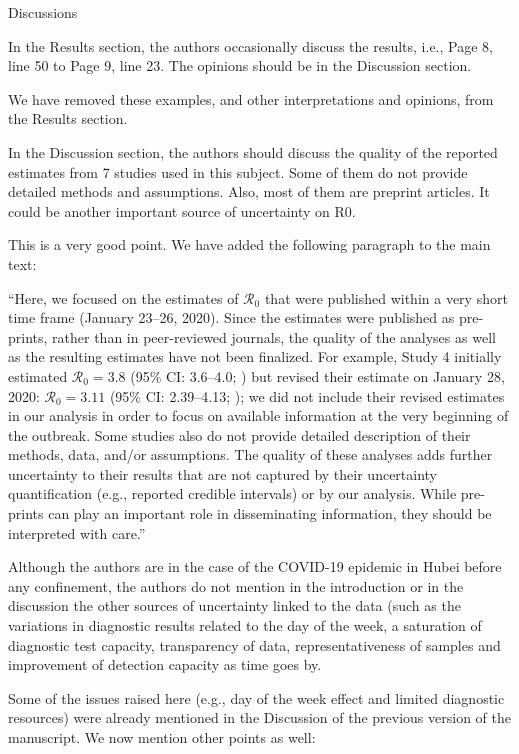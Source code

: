 \documentclass[12pt]{article}
\newcommand{\Ro}{\ensuremath{{\mathcal R}_{0}}\xspace}
\newcommand{\revtext}{\textsf}
\begin{document}
\revtext{Discussions}

\revtext{In the Results section, the authors occasionally discuss the results, i.e., Page 8, line 50 to Page
9, line 23. The opinions should be in the Discussion section.}

We have removed these examples, and other interpretations and opinions, from the Results section.

\revtext{In the Discussion section, the authors should discuss the quality of the reported estimates from
7 studies used in this subject. Some of them do not provide detailed methods and assumptions.
Also, most of them are preprint articles. It could be another important source of uncertainty on
R0.}

This is a very good point. We have added the following paragraph to the main text:

``Here, we focused on the estimates of \Ro that were published within a very short time frame (January 23--26, 2020).
Since the estimates were published as pre-prints, rather than in peer-reviewed journals, the quality of the analyses as well as the resulting estimates have not been finalized.
For example, Study 4 initially estimated $\Ro = 3.8$ (95\% CI: 3.6--4.0; \cite{readncov}) but revised their estimate on January 28, 2020: $\Ro = 3.11$ (95\% CI: 2.39--4.13; \cite{readncov2});
we did not include their revised estimates in our analysis in order to focus on available information at the very beginning of the outbreak.
Some studies also do not provide detailed description of their methods, data, and/or assumptions.
The quality of these analyses adds further uncertainty to their results that are not captured by their uncertainty quantification (e.g., reported credible intervals) or by our analysis.
While pre-prints can play an important role in disseminating information, they should be interpreted with care.''

\revtext{Although the authors are in the case of the COVID-19 epidemic in Hubei before any
confinement, the authors do not mention in the introduction or in the discussion the other
sources of uncertainty linked to the data (such as the variations in diagnostic results related to
the day of the week, a saturation of diagnostic test capacity, transparency of data,
representativeness of samples and improvement of detection capacity as time goes by.}

Some of the issues raised here (e.g., day of the week effect and limited diagnostic resources) were already mentioned in the Discussion of the previous version of the manuscript. We now mention other points as well:
\end{document}
